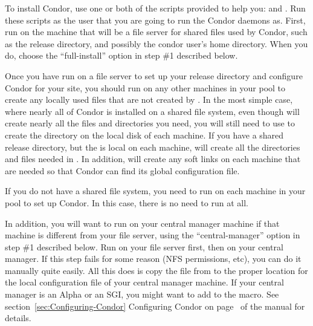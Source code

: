 To install Condor, use one or both of the scripts
provided to help you:  and .
Run these scripts as the user that you are going to run the Condor
daemons as.  First, run  on the machine that will be a
file server for shared files used by Condor, such as the release
directory, and possibly the condor user's home directory.  When you
do, choose the ``full-install'' option in step \#1 described below.

Once you have run  on a file server to set up your
release directory and configure Condor for your site, you should run
 on any other machines in your pool to create any locally
used files that are not created by .  In the most
simple case, where nearly all of Condor is installed on a shared file
system, even though  will create nearly all the files
and directories you need, you will still need to use  to
create the  directory on the local disk of each machine.
If you have a shared release directory, but the  is
local on each machine,  will create all the directories
and files needed in .  In addition, 
will create any soft links on each machine that are needed so that
Condor can find its global configuration file.

If you do not have a shared file system, you need to run
 on each machine in your pool to set up Condor.  In
this case, there is no need to run  at all.

In addition, you will want to run  on your central
manager machine if that machine is different from your file server,
using the ``central-manager'' option in step \#1 described below.  Run
 on your file server first, then on your central
manager.  If this step fails for some reason (NFS permissions, etc),
you can do it manually quite easily.  All this does is copy the
 file from
 to the proper location for the local configuration
file of your central manager machine.  If your central manager is an
Alpha or an SGI, you might want to add  to the
 macro.  See
section~\ref{sec:Configuring-Condor} Configuring Condor on
page~\pageref{sec:Configuring-Condor} of the manual for details.

